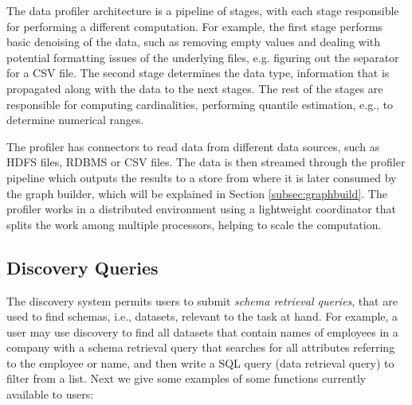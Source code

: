 The data profiler architecture is a pipeline of stages, with each stage
responsible for performing a different computation. For example, the first stage
performs basic denoising of the data, such as removing empty values and dealing
with potential formatting issues of the underlying files, e.g. figuring out the
separator for a CSV file.  The second stage determines the data type,
information that is propagated along with the data to the next stages. The rest
of the stages are responsible for computing cardinalities, performing quantile
estimation, e.g., to determine numerical ranges.

The profiler has connectors to read data from different data sources, such as
HDFS files, RDBMS or CSV files. The data is then streamed through the profiler
pipeline which outputs the results
to a store from where it is later consumed by the graph builder, which will be
explained in Section \ref{subsec:graphbuild}.
The profiler works in a distributed environment using a lightweight coordinator
that splits the work among multiple processors, helping to scale the
computation.



\subsection{Discovery Queries}
\label{subsec:api}

The discovery system permits users to submit \emph{schema retrieval queries},
that are used to find schemas, i.e., datasets, relevant to the task at hand. For
example, a user may use discovery to find all datasets that contain names of
employees in a company with a schema retrieval query that searches for all
attributes referring to the employee or name, and then write a SQL query (data
retrieval query) to filter from a list. Next we give some examples of some functions
currently available to users:

